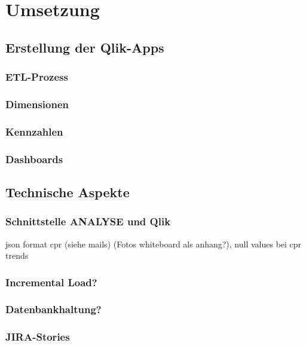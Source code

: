 \chapter{Umsetzung}
\label{kap:umsetzung}
\minitoc\pagebreak

\section{Erstellung der Qlik-Apps}
\subsection{ETL-Prozess}
\subsection{Dimensionen}
\subsection{Kennzahlen}
\subsection{Dashboards}

\section{Technische Aspekte}
\subsection{Schnittstelle ANALYSE und Qlik}
json format cpr (siehe mails) (Fotos whiteboard als anhang?),
null values bei cpr trends
\subsection{Incremental Load?}
\subsection{Datenbankhaltung?}
\subsection{JIRA-Stories}
